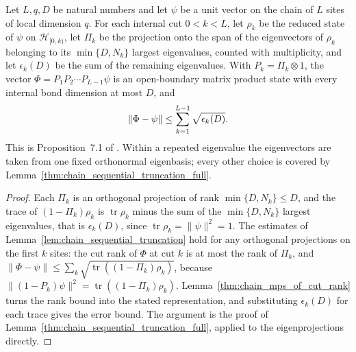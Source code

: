 \begin{lemma}
    \label{thm:chain_sequential_truncation_eigen}
    \leanok
    Let $L,q,D$ be natural numbers and let $\psi$ be a unit vector on the
    chain of $L$ sites of local dimension $q$. For each internal cut
    $0<k<L$, let $\rho_k$ be the reduced state of $\psi$ on
    $\mathcal H_{[0,k)}$, let $\Pi_k$ be the projection onto the span of
    the eigenvectors of $\rho_k$ belonging to its $\min\{D,N_k\}$ largest
    eigenvalues, counted with multiplicity, and let $\epsilon_k(D)$ be the
    sum of the remaining eigenvalues. With $P_k=\Pi_k\otimes1$, the vector
    $\Phi=P_1P_2\cdots P_{L-1}\psi$ is an open-boundary matrix product state
    with every internal bond dimension at most $D$, and
    \begin{align}
        \|\Phi-\psi\|\le\sum_{k=1}^{L-1}\sqrt{\epsilon_k(D)}. \notag
    \end{align}
    This is Proposition~7.1 of \cite[Part~IIa]{TNLean2026OneDimensional}.
    Within a repeated eigenvalue the eigenvectors are taken from one fixed
    orthonormal eigenbasis; every other choice is covered by
    Lemma~\ref{thm:chain_sequential_truncation_full}.
    
\end{lemma}
\begin{proof}
    \leanok
    Each $\Pi_k$ is an orthogonal projection of rank
    $\min\{D,N_k\}\le D$, and the trace of $(1-\Pi_k)\rho_k$ is
    $\operatorname{tr}\rho_k$ minus the sum of the $\min\{D,N_k\}$ largest
    eigenvalues, that is $\epsilon_k(D)$, since
    $\operatorname{tr}\rho_k=\|\psi\|^2=1$. The estimates of
    Lemma~\ref{lem:chain_sequential_truncation} hold for any orthogonal
    projections on the first $k$ sites: the cut rank of $\Phi$ at cut $k$ is
    at most the rank of $\Pi_k$, and
    $\|\Phi-\psi\|\le\sum_k\sqrt{\operatorname{tr}((1-\Pi_k)\rho_k)}$,
    because $\|(1-P_k)\psi\|^2=\operatorname{tr}((1-\Pi_k)\rho_k)$.
    Lemma~\ref{thm:chain_mps_of_cut_rank} turns the rank bound into the
    stated representation, and substituting $\epsilon_k(D)$ for each trace
    gives the error bound. The argument is the proof of
    Lemma~\ref{thm:chain_sequential_truncation_full}, applied to the
    eigenprojections directly.
\end{proof}

